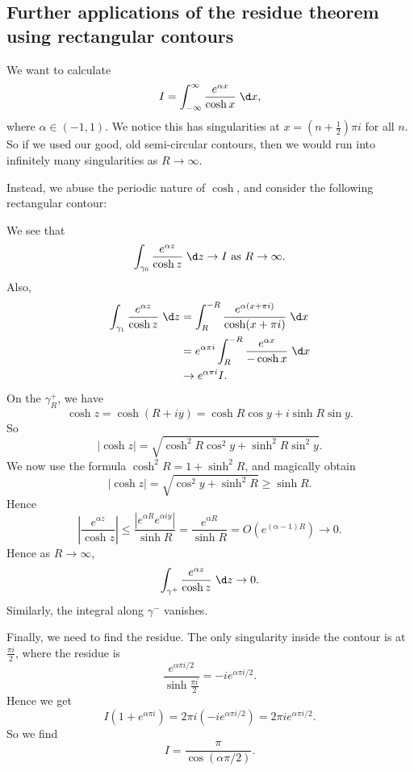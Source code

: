 \documentclass[a4paper]{article}
\begin{document}
\subsection{Further applications of the residue theorem using rectangular contours}
\begin{eg}
  We want to calculate
  \[
    I = \int_{-\infty}^\infty \frac{e^{\alpha x}}{\cosh x}\;\d x,
  \]
  where $\alpha \in (-1, 1)$. We notice this has singularities at $x = \left(n + \frac{1}{2}\right)\pi i$ for all $n$. So if we used our good, old semi-circular contours, then we would run into infinitely many singularities as $R \to \infty$.

  Instead, we abuse the periodic nature of $\cosh$, and consider the following rectangular contour:
  \begin{center}
  \end{center}
  We see that
  \[
    \int_{\gamma_0} \frac{e^{\alpha z}}{\cosh z} \;\d z\to I \text{ as }R \to \infty.
  \]
  Also,
  \begin{align*}
    \int_{\gamma_1} \frac{e^{\alpha z}}{\cosh z} \;\d z &= \int_R^{-R} \frac{e^{\alpha(x + \pi i)}}{\cosh(x + \pi i)}\;\d x\\
    &= e^{\alpha \pi i} \int_R^{-R} \frac{e^{\alpha x}}{-\cosh x}\;\d x\\
    &\to e^{\alpha \pi i}I.
  \end{align*}
  On the $\gamma_R^+$, we have
  \[
    \cosh z = \cosh(R + iy) = \cosh R \cos y + i\sinh R \sin y.
  \]
  So
  \[
    |\cosh z| = \sqrt{\cosh^2 R \cos^2 y + \sinh^2 R \sin^2 y}.
  \]
  We now use the formula $\cosh^2 R = 1 + \sinh^2 R$, and magically obtain
  \[
    |\cosh z| = \sqrt{\cos^2 y + \sinh^2 R} \geq \sinh R.
  \]
  Hence
  \[
    \left|\frac{e^{\alpha z}}{\cosh z}\right| \leq \frac{|e^{\alpha R}e^{\alpha i y}|}{\sinh R} = \frac{e^{\alpha R}}{\sinh R} = O(e^{(\alpha - 1)R}) \to 0.
  \]
  Hence as $R \to \infty$,
  \[
    \int_{\gamma^+} \frac{e^{\alpha z}}{\cosh z} \;\d z\to 0.
  \]
  Similarly, the integral along $\gamma^-$ vanishes.

  Finally, we need to find the residue. The only singularity inside the contour is at $\frac{\pi i}{2}$, where the residue is
  \[
    \frac{e^{\alpha \pi i/2}}{\sinh \frac{\pi i}{2}} = -ie^{\alpha \pi i/2}.
  \]
  Hence we get
  \[
    I ( 1 + e^{\alpha \pi i}) = 2\pi i (-i e^{\alpha \pi i/2}) = 2\pi ie^{\alpha \pi i/2}.
  \]
  So we find
  \[
    I = \frac{\pi}{\cos(\alpha \pi/2)}.
  \]
\end{eg}
\end{document}
